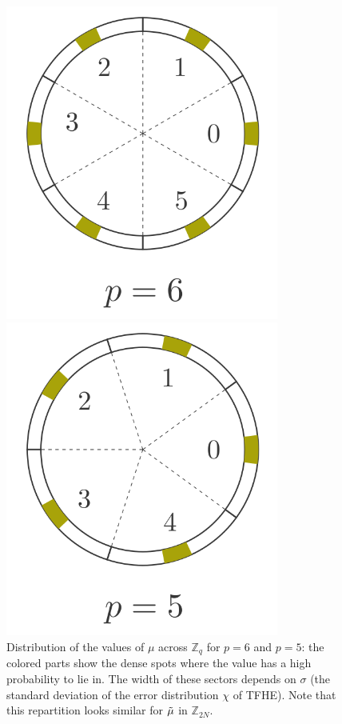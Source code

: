 \begin{figure}[h]
	\centering
	\begin{minipage}{0.47\textwidth}
		\centering
		\includegraphics[width=0.8\textwidth]{img/to_harmonize/busy_sectors_2.png}
	\end{minipage}
	\hspace{0.04\textwidth}
	\begin{minipage}{0.47\textwidth}
		\centering
		\includegraphics[width=0.8\textwidth]{img/to_harmonize/busy_sectors.png}
	\end{minipage}
	\caption{Distribution of the values of $\mu$ across $\mathbb{Z}_q$ for $p = 6$ and $p = 5$: the colored parts show the dense spots where the value has a high probability to lie in. The width of these sectors depends on $\sigma$ (the standard deviation of the error distribution $\chi$ of TFHE). Note that this repartition looks similar for $\Tilde{\mu}$ in $\mathbb{Z}_{2N}$.}
	\label{fig:density_of_phase}
\end{figure}


